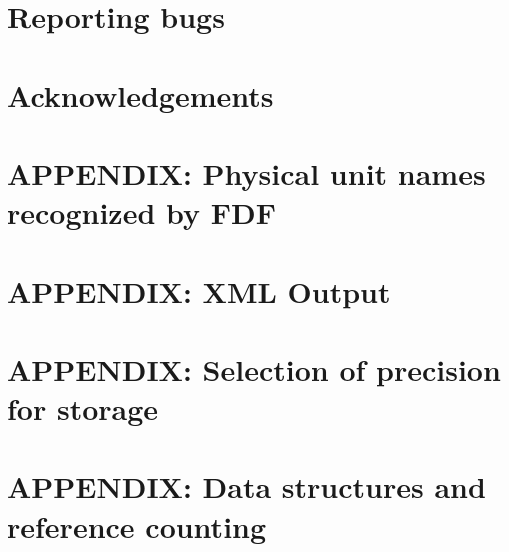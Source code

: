 \section{Reporting bugs}



\section{Acknowledgements}



\section{APPENDIX: Physical unit names recognized by FDF}
\label{sec:fdf-units}



\newpage
\section{APPENDIX: XML Output}



\newpage
\section{APPENDIX: Selection of precision for storage}



\newpage
\section{APPENDIX: Data structures and reference counting}




\clearpage
{}









